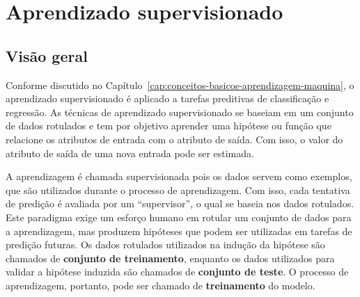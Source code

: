 \chapter{Aprendizado supervisionado}
\label{cap:aprendizado-supervisionado}


\section{Visão geral}

Conforme discutido no Capítulo~\ref{cap:conceitos-basicos-aprendizagem-maquina}, o aprendizado supervisionado é aplicado a tarefas preditivas de classificação e regressão. As técnicas de aprendizado supervisionado se baseiam em um conjunto de dados rotulados e tem por objetivo aprender uma hipótese ou função que relacione os atributos de entrada com o atributo de saída. Com isso, o valor do atributo de saída de uma nova entrada pode ser estimada.

A aprendizagem é chamada supervisionada pois os dados servem como exemplos, que são utilizados durante o processo de aprendizagem. Com isso, cada tentativa de predição é avaliada por um ``supervisor'', o qual se baseia nos dados rotulados. Este paradigma exige um esforço humano em rotular um conjunto de dados para a aprendizagem, mas produzem hipóteses que podem ser utilizadas em tarefas de predição futuras. Os dados rotulados utilizados na indução da hipótese são chamados de \textbf{conjunto de treinamento}, enquanto os dados utilizados para validar a hipótese induzida são chamados de \textbf{conjunto de teste}. O processo de aprendizagem, portanto, pode ser chamado de \textbf{treinamento} do modelo.

